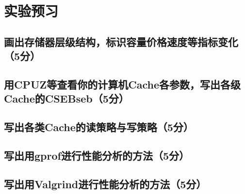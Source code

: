 \section{实验预习}
\subsection{画出存储器层级结构，标识容量价格速度等指标变化（5分）}

\subsection{用CPUZ等查看你的计算机Cache各参数，写出各级Cache的CSEBseb（5分）}

\subsection{写出各类Cache的读策略与写策略（5分）}

\subsection{写出用gprof进行性能分析的方法（5分）}

\subsection{写出用Valgrind进行性能分析的方法（5分）}
